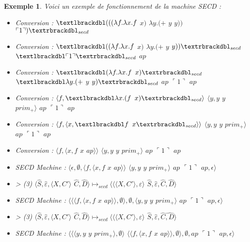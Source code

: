 \documentclass[10pt,a4paper]{report}
\newtheorem{ex}{Exemple}
\begin{document}
	\begin{ex}\label{SECD} Voici un exemple de fonctionnement de la machine SECD : 
		\medbreak
			
		\begin{itemize}
			\item[] Conversion : $\textlbrackdbl(((\lambda f.\lambda x.f$ $x)$ $\lambda y.(+$ $y$ $y))$ $\ulcorner 1\urcorner)\textrbrackdbl_{secd}$
			\item[] Conversion : $\textlbrackdbl((\lambda f.\lambda x.f$ $x)$ $\lambda y.(+$ $y$ $y))\textrbrackdbl_{secd}$ $\textlbrackdbl\ulcorner 1\urcorner\textrbrackdbl_{secd}$ $ap$
			\item[] Conversion : $\textlbrackdbl(\lambda f.\lambda x.f$ $x)\textrbrackdbl_{secd}$ $\textlbrackdbl\lambda y.(+$ $y$ $y)\textrbrackdbl_{secd}$ $ap$ $\ulcorner 1\urcorner$ $ap$
			\item[] Conversion : $\langle f,\textlbrackdbl\lambda x.(f$ $x)\textrbrackdbl_{secd}\rangle$ $\langle y,y$ $y$ $prim_{+}\rangle$ $ap$ $\ulcorner 1\urcorner$ $ap$
			\item[] Conversion : $\langle f,\langle x,\textlbrackdbl f$ $x\textrbrackdbl_{secd}\rangle\rangle$ $\langle y,y$ $y$ $prim_{+}\rangle$ $ap$ $\ulcorner 1\urcorner$ $ap$
			\item[] Conversion : $\langle f,\langle x,f$ $x$ $ap\rangle\rangle$ $\langle y,y$ $y$ $prim_{+}\rangle$ $ap$ $\ulcorner 1\urcorner$ $ap$
			\item[] SECD Machine : $\langle\epsilon,\emptyset,\langle f,\langle x,f$ $x$ $ap\rangle\rangle$ $\langle y,y$ $y$ $prim_{+}\rangle$ $ap$ $\ulcorner 1\urcorner$ $ap,\epsilon\rangle$ 
			\item[] > (3) $\langle\widehat{S},\widehat{\varepsilon},\langle X,C'\rangle$ $\widehat{C},\widehat{D}\rangle \longmapsto_{secd} \langle\langle\langle X,C'\rangle,\varepsilon\rangle$ $\widehat{S},\widehat{\varepsilon},\widehat{C},\widehat{D}\rangle$
			\item[] SECD Machine : $\langle\langle\langle f,\langle x,f$ $x$ $ap\rangle\rangle,\emptyset\rangle,\emptyset,\langle y,y$ $y$ $prim_{+}\rangle$ $ap$ $\ulcorner 1\urcorner$ $ap,\epsilon\rangle$ 
			\item[] > (3) $\langle\widehat{S},\widehat{\varepsilon},\langle X,C'\rangle$ $\widehat{C},\widehat{D}\rangle \longmapsto_{secd} \langle\langle\langle X,C'\rangle,\varepsilon\rangle$ $\widehat{S},\widehat{\varepsilon},\widehat{C}\widehat{,D}\rangle$
			\item[] SECD Machine : $\langle\langle\langle y,y$ $y$ $prim_{+}\rangle,\emptyset\rangle$ $\langle\langle f,\langle x,f$ $x$ $ap\rangle\rangle,\emptyset\rangle,\emptyset,ap$ $\ulcorner 1\urcorner$ $ap,\epsilon\rangle$

\end{itemize}
\end{ex}
\end{document}
